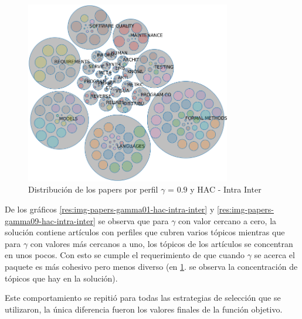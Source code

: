 \begin{figure}[H]
  \centering
    \includegraphics[width=0.8\textwidth]{resultados/papers/HAC/INTRA_INTER/bubbles-gamma-09.png}
  \caption{Distribución de los papers por perfil $\gamma$ = $0.9$ y HAC - Intra Inter}
  \label{res:img-papers-bubbles-gamma09-hac-intra-inter}
\end{figure}

De los gráficos \ref{res:img-papers-gamma01-hac-intra-inter} y \ref{res:img-papers-gamma09-hac-intra-inter} se observa que para $\gamma$ con valor cercano a cero, la solución contiene artículos con perfiles que cubren varios tópicos mientras que para $\gamma$ con valores más cercanos a uno, los tópicos de los artículos se concentran en unos pocos. Con esto se cumple el requerimiento de que cuando $\gamma$ se acerca el paquete es más cohesivo pero menos diverso (en \ref{res:img-papers-bubbles-gamma09-hac-intra-inter}. se observa la concentración de tópicos que hay en la solución).

Este comportamiento se repitió para todas las estrategias de selección que se utilizaron, la única diferencia fueron los valores finales de la función objetivo.
